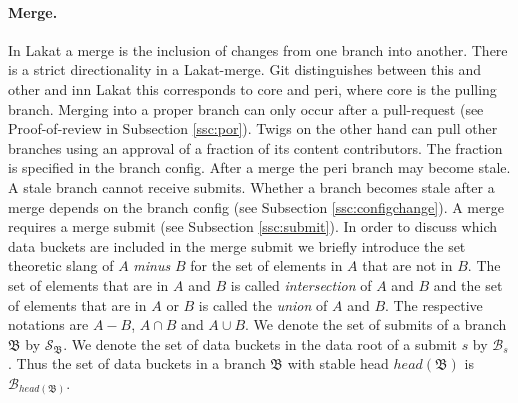 \documentclass[14pt]{article}
\begin{document}
\paragraph{Merge.} In Lakat a merge is the inclusion of changes from one branch into another. There is a strict directionality in a Lakat-merge. Git distinguishes between this and other and inn Lakat this corresponds to core and peri, where core is the pulling branch. Merging into a proper branch can only occur after a pull-request (see Proof-of-review in Subsection \ref{ssc:por}). Twigs on the other hand can pull other branches using an approval of a fraction of its content contributors. The fraction is specified in the branch config. After a merge the peri branch may become stale. A stale branch cannot receive submits. Whether a branch becomes stale after a merge depends on the branch config (see Subsection \ref{ssc:configchange}).
A merge requires a merge submit (see Subsection \ref{ssc:submit}). In order to discuss which data buckets are included in the merge submit we briefly introduce the set theoretic slang of $A$ \textit{minus} $B$ for the set of elements in $A$ that are not in $B$. The set of elements that are in $A$ and $B$ is called \textit{intersection} of $A$ and $B$ and the set of elements that are in $A$ or $B$ is called the \textit{union} of $A$ and $B$. The respective notations are $A-B$, $A\cap B$ and $A\cup B$. We denote the set of submits of a branch $\mathfrak B$ by $\mathcal S_{\mathfrak B}$. We denote the set of data buckets in the data root of a submit $s$ by $\mathcal{B}_s$. Thus the set of data buckets in a branch $\mathfrak B$ with stable head $head(\mathfrak B)$ is $\mathcal{B}_{head(\mathfrak B)}$. 
\end{document}
